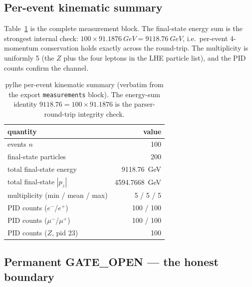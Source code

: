 \subsection{Per-event kinematic summary}
\label{app:lhe-stats}

Table~\ref{tab:app-lhe-meas} is the complete measurement block. The
final-state energy sum is the strongest internal check:
$100 \times \SI{91.1876}{GeV} = \SI{9118.76}{GeV}$, i.e.\ per-event
4-momentum conservation holds exactly across the round-trip. The
multiplicity is uniformly 5 (the $Z$ plus the four leptons in the LHE
particle list), and the PID counts confirm the channel.

\begin{table}[h]
\centering
\small
\begin{tabular}{@{}l r@{}}
\toprule
quantity & value \\
\midrule
events $n$                          & 100 \\
final-state particles              & 200 \\
total final-state energy           & \SI{9118.76}{GeV} \\
total final-state $|p_z|$          & \SI{4594.7668}{GeV} \\
multiplicity (min / mean / max)    & 5 / 5 / 5 \\
PID counts ($e^-$/$e^+$)           & 100 / 100 \\
PID counts ($\mu^-$/$\mu^+$)       & 100 / 100 \\
PID counts ($Z$, pid 23)           & 100 \\
\bottomrule
\end{tabular}
\caption{pylhe per-event kinematic summary (verbatim from the export
\texttt{measurements} block). The energy-sum identity
$9118.76 = 100\times 91.1876$ is the parser-round-trip integrity check.}
\label{tab:app-lhe-meas}
\end{table}

\subsection{Permanent GATE\_OPEN --- the honest boundary}
\label{app:lhe-honesty}

